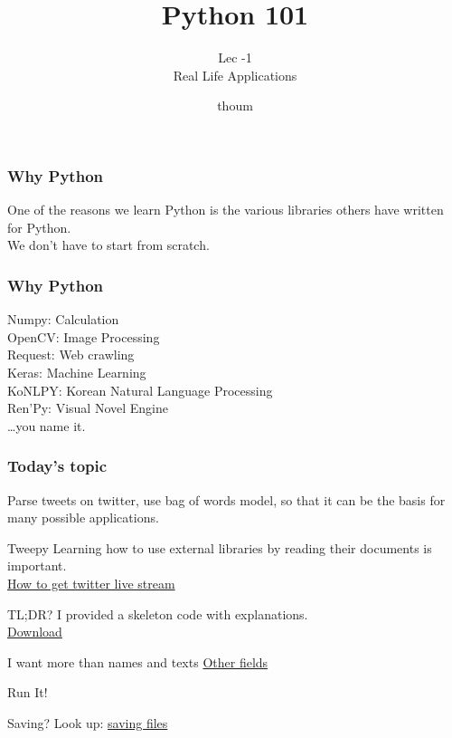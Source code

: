 \documentclass{beamer}
\title{Python 101}
\subtitle{Lec -1 \\ Real Life Applications}
\author{thoum}
\begin{document}
\frame{\titlepage}

\begin{frame}
\frametitle{Why Python}
One of the reasons we learn Python is the various libraries others have written
  for Python.\\ We don't have to start from scratch.
\end{frame}

\begin{frame}
\frametitle{Why Python}
Numpy: Calculation\\
OpenCV: Image Processing\\
Request: Web crawling\\
Keras: Machine Learning\\
KoNLPY: Korean Natural Language Processing\\
Ren'Py: Visual Novel Engine\\
\ldots you name it.
\end{frame}

\begin{frame}
\frametitle{Today's topic}
Parse tweets on twitter, use bag of words model, so that it can be the
  basis for many possible applications.
\end{frame}

\begin{frame}{Tweepy}
  Learning how to use external libraries by reading their documents is
  important.\\
  \href{https://tweepy.readthedocs.io/en/latest/streaming\_how\_to.html}{How to
  get twitter live stream}
\end{frame}

\begin{frame}{TL;DR?}
  I provided a skeleton code with explanations.\\
  \href{https://github.com/indiofish/python\_tutor/blob/master/lec08/tweet.py}{Download}
\end{frame}

\begin{frame}{I want more than names and texts}
  \href{https://developer.twitter.com/en/docs/tweets/sample-realtime/api-reference/get-statuses-sample}{Other
  fields}
\end{frame}

\begin{frame}{Run It!}
\end{frame}

\begin{frame}{Saving?}
  Look up:
  \href{https://www.google.com/search?q=python+save+list+as+file}{saving
  files}
\end{frame}
\end{document}
